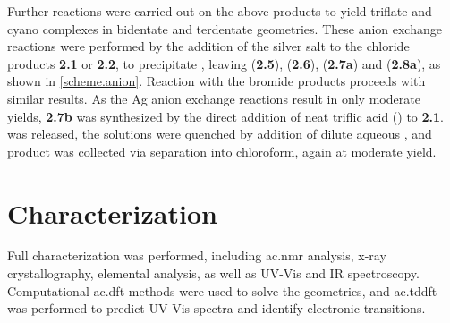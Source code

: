 Further reactions were carried out on the above products to yield triflate and cyano complexes in bidentate and terdentate geometries. These anion exchange reactions were performed by the addition of the silver salt to the chloride products \textbf{2.1} or \textbf{2.2}, to precipitate , leaving  (\textbf{2.5}),  (\textbf{2.6}),  (\textbf{2.7a}) and  (\textbf{2.8a}), as shown in \autoref{scheme.anion}. Reaction with the bromide products proceeds with similar results. As the Ag anion exchange reactions result in only moderate yields, \textbf{2.7b} was synthesized by the direct addition of neat triflic acid () to \textbf{2.1}.  was released, the solutions were quenched by addition of dilute aqueous , and product was collected via separation into chloroform, again at moderate yield. 



\section{Characterization}

Full characterization was performed, including \Gls{ac.nmr} analysis, x-ray crystallography, elemental analysis, as well as UV-Vis and IR spectroscopy. Computational \gls{ac.dft} methods were used to solve the geometries, and \gls{ac.tddft} was performed to predict UV-Vis spectra and identify electronic transitions. 

